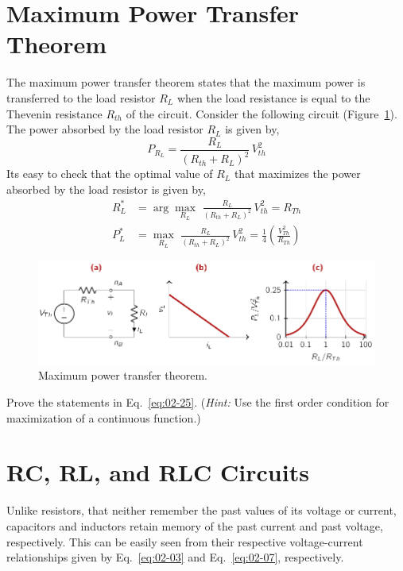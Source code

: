\section{Maximum Power Transfer Theorem}
The maximum power transfer theorem states that the maximum power is transferred to the load resistor $R_L$ when the load resistance is equal to the Thevenin resistance $R_{th}$ of the circuit. Consider the following circuit (Figure~\ref{fig:02-06}). The power absorbed by the load resistor $R_L$ is given by,
\begin{equation}
    P_{R_L} = \frac{R_L}{(R_{th} + R_L)^2} \, V_{th}^2
    \label{eq:02-24}
\end{equation}
Its easy to check that the optimal value of $R_L$ that maximizes the power absorbed by the load resistor is given by,
\begin{equation}
    \begin{split}
        R_L^* &= \arg\max_{R_L} \,\, \frac{R_L}{(R_{th} + R_L)^2} \, V_{th}^2 = R_{Th} \\
        P_L^* &= \max_{R_L} \,\, \frac{R_L}{(R_{th} + R_L)^2} \, V_{th}^2 = \frac{1}{4}\left(\frac{V_{Th}^2}{R_{Th}}\right)
    \end{split}
    \label{eq:02-25}
\end{equation}

\begin{figure}[t]
    \centering
    \includegraphics[width=\textwidth]{figure/ch02/fig02-06.pdf}
    \caption{Maximum power transfer theorem.}
    \label{fig:02-06}
\end{figure}

\begin{boxedstuff}
    \begin{problem}
        Prove the statements in Eq.~\ref{eq:02-25}. (\textit{Hint:} Use the first order condition for maximization of a continuous function.)
    \end{problem}
\end{boxedstuff}

\section{RC, RL, and RLC Circuits}
Unlike resistors, that neither remember the past values of its voltage or current, capacitors and inductors retain memory of the past current and past voltage, respectively. This can be easily seen from their respective voltage-current relationships given by Eq.~\ref{eq:02-03} and Eq.~\ref{eq:02-07}, respectively. 

